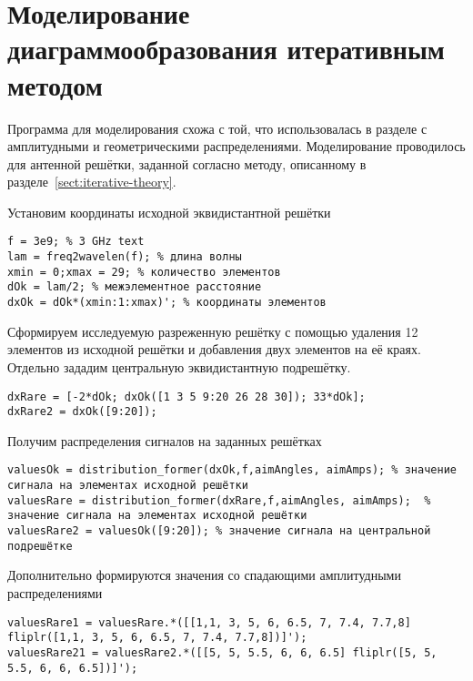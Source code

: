 \section{Моделирование диаграммообразования итеративным методом}\label{sect:iterative-modeling}

Программа для моделирования схожа с той, что использовалась 
в разделе с амплитудными и геометрическими распределениями. 
Моделирование проводилось для антенной решётки, заданной согласно методу, описанному в разделе~\ref{sect:iterative-theory}.

Установим координаты исходной эквидистантной решётки

\begin{verbatim}
f = 3e9; % 3 GHz text
lam = freq2wavelen(f); % длина волны
xmin = 0;xmax = 29; % количество элементов
dOk = lam/2; % межэлементное расстояние
dxOk = dOk*(xmin:1:xmax)'; % координаты элементов     
\end{verbatim}

Сформируем исследуемую разреженную решётку с помощью удаления 12 элементов из исходной решётки и 
добавления двух элементов на её краях. Отдельно зададим центральную эквидистантную подрешётку.

\begin{verbatim}
dxRare = [-2*dOk; dxOk([1 3 5 9:20 26 28 30]); 33*dOk];
dxRare2 = dxOk([9:20]);   
\end{verbatim}

Получим распределения сигналов на заданных решётках

\begin{verbatim}
valuesOk = distribution_former(dxOk,f,aimAngles, aimAmps); % значение сигнала на элементах исходной решётки
valuesRare = distribution_former(dxRare,f,aimAngles, aimAmps);  % значение сигнала на элементах исходной решётки
valuesRare2 = valuesOk([9:20]); % значение сигнала на центральной подрешётке
\end{verbatim}

Дополнительно формируются значения со спадающими амплитудными распределениями

\begin{verbatim}
valuesRare1 = valuesRare.*([[1,1, 3, 5, 6, 6.5, 7, 7.4, 7.7,8] fliplr([1,1, 3, 5, 6, 6.5, 7, 7.4, 7.7,8])]');
valuesRare21 = valuesRare2.*([[5, 5, 5.5, 6, 6, 6.5] fliplr([5, 5, 5.5, 6, 6, 6.5])]');  
\end{verbatim}

